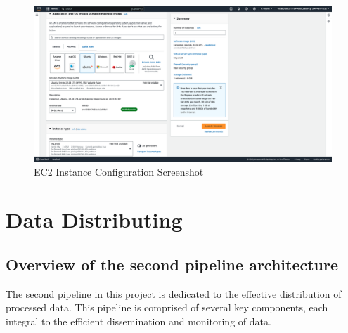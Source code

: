 \documentclass[12pt,oneside]{book} %
\begin{document}
\begin{figure}[H]
    \centering
    \includegraphics[width=1\linewidth]{images/t4g-small.png}
    \caption{EC2 Instance Configuration Screenshot}\label{fig:ec2-instance-configuration}
\end{figure}

\newpage
\section{Data Distributing}

\subsection{Overview of the second pipeline architecture}
The second pipeline in this project is dedicated to the effective distribution
of processed data. This pipeline is comprised of several key components, each
integral to the efficient dissemination and monitoring of data.
\end{document}
